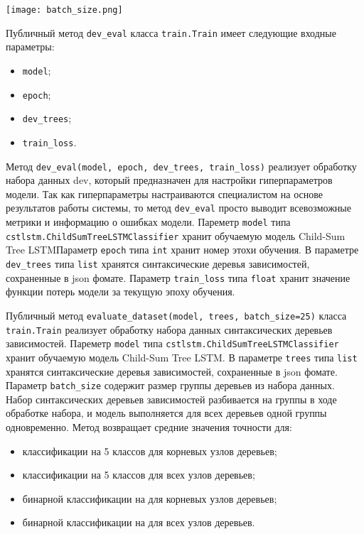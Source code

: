 \begin{center}
  \texttt{[image: batch\_size.png]}
  \label{fig:func:batch_size}
\end{center}

Публичный метод \texttt{dev\_eval} класса \texttt{train.Train} имеет следующие входные параметры:
\begin{itemize}
\item \texttt{model};
\item \texttt{epoch};
\item \texttt{dev\_trees};
\item \texttt{train\_loss}.
\end{itemize}

Метод \texttt{dev\_eval(model, epoch, dev\_trees, train\_loss)} реализует обработку набора данных dev, который предназначен для настройки гиперпараметров модели. Так как гиперпараметры настраиваются специалистом на основе результатов работы системы, то метод \texttt{dev\_eval} просто выводит всевозможные метрики и информацию о ошибках модели. Пареметр \texttt{model} типа \texttt{cstlstm.ChildSumTreeLSTMClassifier} хранит обучаемую модель Child-Sum Tree LSTM\@ Параметр \texttt{epoch} типа \texttt{int} хранит номер этохи обучения. В параметре \texttt{dev\_trees} типа \texttt{list} хранятся синтаксические деревья зависимостей, сохраненные в json фомате. Параметр \texttt{train\_loss} типа \texttt{float} хранит значение функции потерь модели за текущую эпоху обучения.

Публичный метод \texttt{evaluate\_dataset(model, trees, batch\_size=25)} класса \texttt{train.Train} реализует обработку набора данных синтаксических деревьев зависимостей. Пареметр \texttt{model} типа \texttt{cstlstm.ChildSumTreeLSTMClassifier} хранит обучаемую модель Child-Sum Tree LSTM\@. В параметре \texttt{trees} типа \texttt{list} хранятся синтаксические деревья зависимостей, сохраненные в json фомате. Параметр \texttt{batch\_size} содержит размер группы деревьев из набора данных. Набор синтаксических деревьев зависимостей разбивается на группы в ходе обработке набора, и модель выполняется для всех деревьев одной группы одновременно. Метод возвращает средние значения точности для:
\begin{itemize}
\item классификации на 5 классов для корневых узлов деревьев;
\item классификации на 5 классов для всех узлов деревьев;
\item бинарной классификации на для корневых узлов деревьев;
\item бинарной классификации на для всех узлов деревьев.
\end{itemize}

